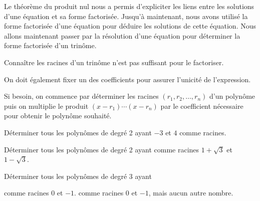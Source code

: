 \documentclass[a4paper,12pt]{report}
\begin{document}
Le théorème du produit nul nous a permis d'expliciter les liens entre les solutions d'une équation et sa forme factorisée.
Jusqu'à maintenant, nous avons utilisé la forme factorisée d'une équation pour déduire les solutions de cette équation.
Nous allons maintenant passer par la résolution d'une équation pour déterminer la forme factorisée d'un trinôme. 
\begin{boiteExT}[Rappels]
	\vspace{8cm}

\end{boiteExT}
Connaître les racines d'un trinôme n'est pas suffisant pour le factoriser.
\begin{boiteExT}
	\vspace{4.5cm}

\end{boiteExT}
On doit également fixer un des coefficients pour assurer l'unicité de l'expression.

\begin{boiteExT}
	\vspace{5cm}	
\end{boiteExT}
Si besoin, on commence par déterminer les racines $(r_1, r_2, \ldots, r_n)$ d'un polynôme puis on multiplie le produit $(x-r_1)\cdots (x-r_n)$ par le coefficient nécessaire pour obtenir le polynôme souhaité. 
\begin{boiteExT}[Factoriser $2x^2-3x+1$]
	\vspace{8cm}
\end{boiteExT}
\begin{exo}
	Déterminer tous les polynômes de degré 2 ayant $-3$ et $4$ comme racines.
\end{exo}
\begin{exo}
	Déterminer tous les polynômes de degré 2 ayant comme racines $1+\sqrt{3}$ et $1-\sqrt{3}$.
\end{exo}
\begin{exo}
	Déterminer tous les polynômes de degré 3 ayant
\begin{tasks}
	\task comme racines $0$ et $-1$.
	\task comme racines $0$ et $-1$, mais aucun autre nombre.
\end{tasks}
\end{exo}
\end{document}
